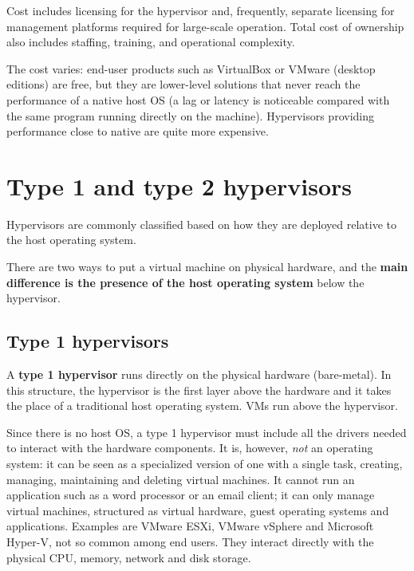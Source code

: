 Cost includes licensing for the hypervisor and, frequently, separate licensing for management platforms required for large-scale operation. Total cost of ownership also includes staffing, training, and operational complexity.

The cost varies: end-user products such as VirtualBox or VMware (desktop editions) are free, but they are lower-level solutions that never reach the performance of a native host OS (a lag or latency is noticeable compared with the same program running directly on the machine). Hypervisors providing performance close to native are quite more expensive.

\section{Type 1 and type 2 hypervisors}

Hypervisors are commonly classified based on how they are deployed relative to the host operating system.

There are two ways to put a virtual machine on physical hardware, and the \textbf{main difference is the presence of the host operating system} below the hypervisor.

\begin{center}
\end{center}

\subsection{Type 1 hypervisors}

A \textbf{type 1 hypervisor} runs directly on the physical hardware (bare-metal). In this structure, the hypervisor is the first layer above the hardware and it takes the place of a traditional host operating system. VMs run above the hypervisor.

Since there is no host OS, a type 1 hypervisor must include all the drivers needed to interact with the hardware components. It is, however, \emph{not} an operating system: it can be seen as a specialized version of one with a single task, creating, managing, maintaining and deleting virtual machines. It cannot run an application such as a word processor or an email client; it can only manage virtual machines, structured as virtual hardware, guest operating systems and applications. Examples are VMware ESXi, VMware vSphere and Microsoft Hyper-V, not so common among end users. They interact directly with the physical CPU, memory, network and disk storage.

